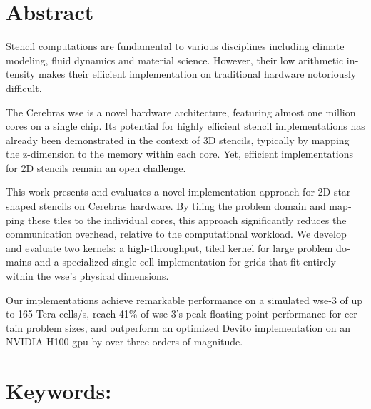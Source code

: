 \begin{otherlanguage}{english}
\section*{Abstract}
Stencil computations are fundamental to various disciplines including climate modeling, fluid dynamics and material science.
However, their low arithmetic intensity makes their efficient implementation on traditional hardware notoriously difficult.

The Cerebras \acf{wse} is a novel hardware architecture, featuring almost one million cores on a single chip. Its potential for highly efficient stencil implementations has already been demonstrated in the context of 3D stencils, typically by mapping the z-dimension to the memory within each core. Yet, efficient implementations for 2D stencils remain an open challenge.

This work presents and evaluates a novel implementation approach for 2D star-shaped stencils on Cerebras hardware. By tiling the problem domain and mapping these tiles to the individual cores, this approach significantly reduces the communication overhead, relative to the computational workload. We develop and evaluate two kernels: a high-throughput, tiled kernel for large problem domains and a specialized single-cell implementation for grids that fit entirely within the \ac{wse}'s physical dimensions.

Our implementations achieve remarkable performance on a simulated \ac{wse}-3 of up to 165 Tera-cells/s, reach 41\% of \ac{wse}-3's peak floating-point performance for certain problem sizes, and outperform an optimized Devito implementation on an NVIDIA H100 \ac{gpu} by over three orders of magnitude. 
\section*{Keywords:} \itshape \englishkeywords
\end{otherlanguage}